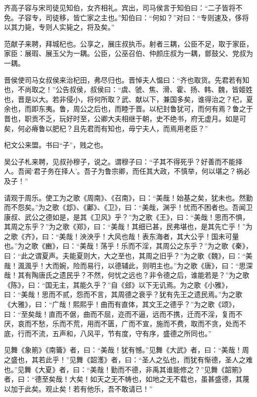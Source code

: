 \documentclass[]{article}
\begin{document}
齐高子容与宋司徒见知伯，女齐相礼。宾出，司马侯言于知伯曰：``二子皆将不免。子容专，司徒移，皆亡家之主也。''知伯曰：``何如？''对曰：``专则速及，侈将以其力毙，专则人实毙之，将及矣。''

范献子来聘，拜城杞也。公享之，展庄叔执币。射者三耦，公臣不足，取于家臣，家臣：展瑕、展玉父为一耦。公臣，公巫召伯、仲颜庄叔为一耦，鄫鼓父、党叔为一耦。

晋侯使司马女叔侯来治杞田，弗尽归也。晋悼夫人愠曰：``齐也取货。先君若有知也，不尚取之！''公告叔侯，叔侯曰：``虞、虢、焦、滑、霍、扬、韩、魏，皆姬姓也，晋是以大。若非侵小，将何所取？武、献以下，兼国多矣，谁得治之？杞，夏余也，而即东夷。鲁，周公之后也，而睦于晋。以杞封鲁犹可，而何有焉？鲁之于晋也，职贡不乏，玩好时至，公卿大夫相继于朝，史不绝书，府无虚月。如是可矣，何必瘠鲁以肥杞？且先君而有知也，毋宁夫人，而焉用老臣？''

杞文公来盟。书曰``子''，贱之也。

吴公子札来聘，见叔孙穆子，说之。谓穆子曰：``子其不得死乎？好善而不能择人。吾闻`君子务在择人'。吾子为鲁宗卿，而任其大政，不慎举，何以堪之？祸必及子！''

请观于周乐。使工为之歌《周南》、《召南》，曰：``美哉！始基之矣，犹未也。然勤而不怨矣。''为之歌《邶》、《鄘》、《卫》，曰：``美哉，渊乎！忧而不困者也。吾闻卫康叔、武公之德如是，是其《卫风》乎？''为之歌《王》，曰：``美哉！思而不惧，其周之东乎？''为之歌《郑》，曰：``美哉！其细已甚，民弗堪也，是其先亡乎！''为之歌《齐》，曰：``美哉！泱泱乎！大风也哉！表东海者，其大公乎！国未可量也。''为之歌《豳》，曰：``美哉！荡乎！乐而不淫，其周公之东乎？''为之歌《秦》，曰：``此之谓夏声。夫能夏则大，大之至也，其周之旧乎？''为之歌《魏》，曰：``美哉！渢渢乎！大而婉，险而易行，以德辅此，则明主也。''为之歌《唐》，曰：``思深哉！其有陶唐氏之遗民乎？不然，何忧之远也？非令德之后，谁能若是？''为之歌《陈》，曰：``国无主，其能久乎？''自《郐》以下无讥焉。为之歌《小雅》，曰：``美哉！思而不贰，怨而不言，其周德之衰乎？犹有先王之遗民焉。''为之歌《大雅》，曰：``广哉！熙熙乎！曲而有直体，其文王之德乎？''为之歌《颂》，曰：``至矣哉！直而不倨，曲而不屈，迩而不逼，远而不携，迁而不淫，复而不厌，哀而不愁，乐而不荒，用而不匮，广而不宣，施而不费，取而不贪，处而不底，行而不流，五声和，八风平，节有度，守有序，盛德之所同也。''

见舞《象箾》《南籥》者，曰：``美哉！犹有憾。''见舞《大武》者，曰：``美哉！周之盛也，其若此乎！''见舞《韶濩》者，曰：``圣人之弘也，而犹有惭德，圣人之难也。''见舞《大夏》者，曰：``美哉！勤而不德，非禹其谁能修之？''见舞《韶箾》者，曰：``德至矣哉！大矣！如天之无不帱也，如地之无不载也，虽甚盛德，其蔑以加于此矣。观止矣！若有他乐，吾不敢请已！''
\end{document}

